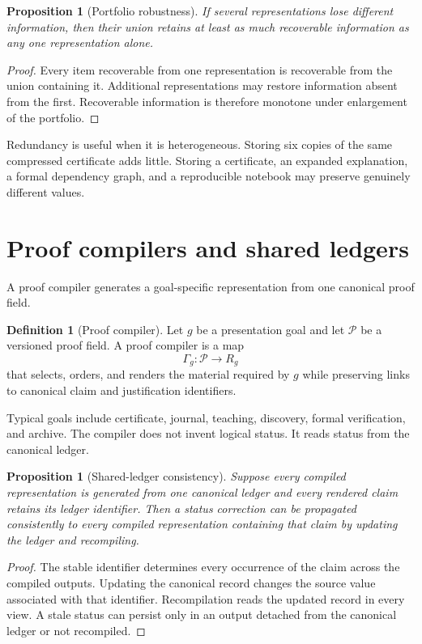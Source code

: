 \documentclass[11pt,oneside]{article}
\newtheorem{proposition}[theorem]{Proposition}
\theoremstyle{definition}
\newtheorem{definition}[theorem]{Definition}
\theoremstyle{remark}
\newcommand{\Pcal}{\mathcal P}
\begin{document}
\begin{proposition}[Portfolio robustness]
If several representations lose different information, then their union retains at least as much recoverable information as any one representation alone.
\end{proposition}

\begin{proof}
Every item recoverable from one representation is recoverable from the union containing it. Additional representations may restore information absent from the first. Recoverable information is therefore monotone under enlargement of the portfolio.
\end{proof}

Redundancy is useful when it is heterogeneous. Storing six copies of the same compressed certificate adds little. Storing a certificate, an expanded explanation, a formal dependency graph, and a reproducible notebook may preserve genuinely different values.

\section{Proof compilers and shared ledgers}

A proof compiler generates a goal-specific representation from one canonical proof field.

\begin{definition}[Proof compiler]
Let $g$ be a presentation goal and let $\Pcal$ be a versioned proof field. A proof compiler is a map
\[
\Gamma_g:\Pcal\longrightarrow R_g
\]
that selects, orders, and renders the material required by $g$ while preserving links to canonical claim and justification identifiers.
\end{definition}

Typical goals include certificate, journal, teaching, discovery, formal verification, and archive. The compiler does not invent logical status. It reads status from the canonical ledger.

\begin{proposition}[Shared-ledger consistency]
Suppose every compiled representation is generated from one canonical ledger and every rendered claim retains its ledger identifier. Then a status correction can be propagated consistently to every compiled representation containing that claim by updating the ledger and recompiling.
\end{proposition}

\begin{proof}
The stable identifier determines every occurrence of the claim across the compiled outputs. Updating the canonical record changes the source value associated with that identifier. Recompilation reads the updated record in every view. A stale status can persist only in an output detached from the canonical ledger or not recompiled.
\end{proof}
\end{document}
